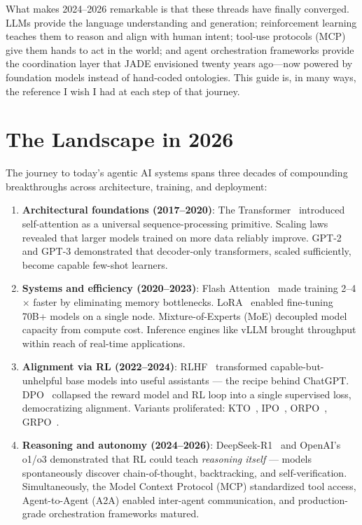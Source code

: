 \documentclass[11pt,a4paper,openany]{book}
\begin{document}
What makes 2024--2026 remarkable is that these threads have finally converged. LLMs provide the language understanding and generation; reinforcement learning teaches them to reason and align with human intent; tool-use protocols (MCP) give them hands to act in the world; and agent orchestration frameworks provide the coordination layer that JADE envisioned twenty years ago---now powered by foundation models instead of hand-coded ontologies. This guide is, in many ways, the reference I wish I had at each step of that journey.

\section*{The Landscape in 2026}
\label{the-landscape-in-2026}

The journey to today’s agentic AI systems spans three decades of compounding breakthroughs across architecture, training, and deployment:

\begin{enumerate}
  \item \textbf{Architectural foundations (2017--2020)}: The Transformer~\cite{vaswani2017attention} introduced self-attention as a universal sequence-processing primitive. Scaling laws revealed that larger models trained on more data reliably improve. GPT-2 and GPT-3 demonstrated that decoder-only transformers, scaled sufficiently, become capable few-shot learners.
  \item \textbf{Systems and efficiency (2020--2023)}: Flash Attention~\cite{dao2022flashattention} made training 2--4$\times$ faster by eliminating memory bottlenecks. LoRA~\cite{hu2022lora} enabled fine-tuning 70B+ models on a single node. Mixture-of-Experts (MoE) decoupled model capacity from compute cost. Inference engines like vLLM brought throughput within reach of real-time applications.
  \item \textbf{Alignment via RL (2022--2024)}: RLHF~\cite{ouyang2022training} transformed capable-but-unhelpful base models into useful assistants --- the recipe behind ChatGPT. DPO~\cite{rafailov2023direct} collapsed the reward model and RL loop into a single supervised loss, democratizing alignment. Variants proliferated: KTO~\cite{ethayarajh2024kto}, IPO~\cite{azar2024general}, ORPO~\cite{hong2024orpo}, GRPO~\cite{shao2024deepseekmath}.
  \item \textbf{Reasoning and autonomy (2024--2026)}: DeepSeek-R1~\cite{deepseek2025r1} and OpenAI’s o1/o3 demonstrated that RL could teach \emph{reasoning itself} --- models spontaneously discover chain-of-thought, backtracking, and self-verification. Simultaneously, the Model Context Protocol (MCP) standardized tool access, Agent-to-Agent (A2A) enabled inter-agent communication, and production-grade orchestration frameworks matured.
\end{enumerate}
\end{document}
